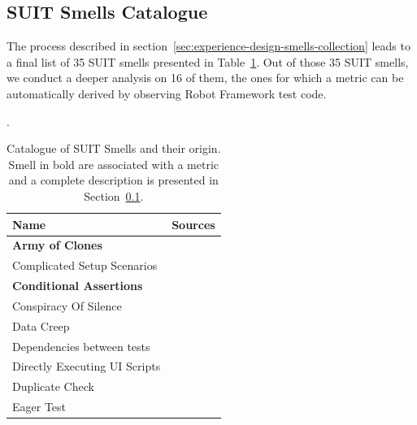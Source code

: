 \subsection{SUIT Smells Catalogue}
\label{sec:results-smells-catalogue}

The process described in section~\ref{sec:experience-design-smells-collection} leads to a final list of 35 SUIT smells presented in Table~\ref{tab:smell-catalogue}. Out of those 35 SUIT smells, we conduct a deeper analysis on 16 of them, the ones for which a metric can be automatically derived by observing Robot Framework test code.

\begin{table}
\centering

\caption{Catalogue of SUIT Smells and their origin. Smell in bold are associated with a metric and a complete description is presented in Section~\ref{sec:results-smells-catalogue}.}
\label{tab:smell-catalogue}.

\begin{tabular}{>{\raggedright}p{1.5in}>{\raggedright}p{4in}}

\toprule
\scriptsize{\textbf{Name}} & \scriptsize{\textbf{Sources}}\tabularnewline
\toprule

\scriptsize{\textbf{Army of Clones}} & \scriptsize{\cite{Chen2012, Hauptmann2013, Hauptmann2015, Jones2019}} \tabularnewline 


\scriptsize{Complicated Setup Scenarios} & \scriptsize{\cite{Scott2015}} \tabularnewline 

\scriptsize{\textbf{Conditional Assertions}} & \scriptsize{\cite{Gawinecki2016}} \tabularnewline 

\scriptsize{Conspiracy Of Silence} & \scriptsize{\cite{Gawinecki2016, Sheth2020}} \tabularnewline 

\scriptsize{Data Creep} & \scriptsize{\cite{Alegroth2016b, Siminiuc2019, Shay2019}} \tabularnewline 

\scriptsize{Dependencies between tests} & \scriptsize{\cite{Klarck2014, Advolodkin2018, Cripsin2018, Bushnev2019, Goldberg2019}} \tabularnewline 

\scriptsize{Directly Executing UI Scripts} & \scriptsize{\cite{Scott2015}} \tabularnewline 

\scriptsize{Duplicate Check} & \scriptsize{\cite{Buwalda2019}} \tabularnewline 

\scriptsize{Eager Test} &  \scriptsize{\cite{England2016, Renaudin2016, Cripsin2018, Sciamanna2019, Temov2020}} \tabularnewline 


\end{tabular}
\end{table}
